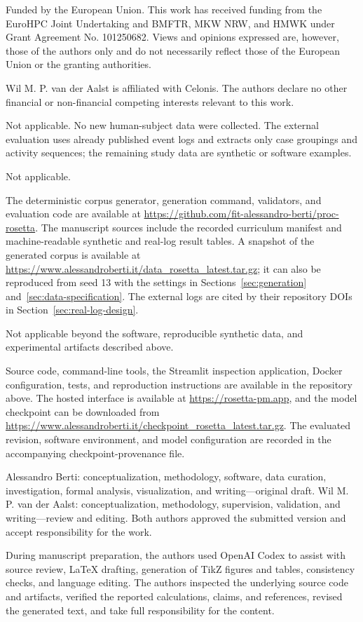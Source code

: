 \documentclass[pdflatex,sn-basic]{sn-jnl}
\begin{document}
Funded by the European Union. This work has received funding from the EuroHPC Joint Undertaking and BMFTR, MKW NRW, and HMWK under Grant Agreement No. 101250682. Views and opinions expressed are, however, those of the authors only and do not necessarily reflect those of the European Union or the granting authorities.

Wil M. P. van der Aalst is affiliated with Celonis. The authors declare no other financial or non-financial competing interests relevant to this work.

Not applicable. No new human-subject data were collected. The external evaluation uses already published event logs and extracts only case groupings and activity sequences; the remaining study data are synthetic or software examples.

Not applicable.

The deterministic corpus generator, generation command, validators, and evaluation code are available at \url{https://github.com/fit-alessandro-berti/proc-rosetta}. The manuscript sources include the recorded curriculum manifest and machine-readable synthetic and real-log result tables. A snapshot of the generated corpus is available at \url{https://www.alessandroberti.it/data_rosetta_latest.tar.gz}; it can also be reproduced from seed 13 with the settings in Sections~\ref{sec:generation} and~\ref{sec:data-specification}. The external logs are cited by their repository DOIs in Section~\ref{sec:real-log-design}.

Not applicable beyond the software, reproducible synthetic data, and experimental artifacts described above.

Source code, command-line tools, the Streamlit inspection application, Docker configuration, tests, and reproduction instructions are available in the repository above. The hosted interface is available at \url{https://rosetta-pm.app}, and the model checkpoint can be downloaded from \url{https://www.alessandroberti.it/checkpoint_rosetta_latest.tar.gz}. The evaluated revision, software environment, and model configuration are recorded in the accompanying checkpoint-provenance file.

Alessandro Berti: conceptualization, methodology, software, data curation, investigation, formal analysis, visualization, and writing---original draft. Wil M. P. van der Aalst: conceptualization, methodology, supervision, validation, and writing---review and editing. Both authors approved the submitted version and accept responsibility for the work.

During manuscript preparation, the authors used OpenAI Codex to assist with source review, LaTeX drafting, generation of TikZ figures and tables, consistency checks, and language editing. The authors inspected the underlying source code and artifacts, verified the reported calculations, claims, and references, revised the generated text, and take full responsibility for the content.


\end{document}
